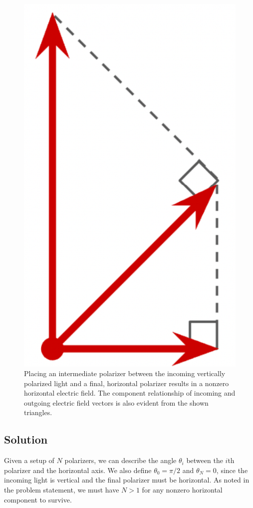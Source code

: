 \documentclass[reqno]{amsart}
\begin{document}
\begin{figure}[h]
	\centering
	\includegraphics[scale = 0.5]{Polarizers.png}
	\caption{Placing an intermediate polarizer between the incoming vertically polarized light and a final, horizontal polarizer results in a nonzero horizontal electric field. The component relationship of incoming and outgoing electric field vectors is also evident from the shown triangles.}
	\label{fig:polarizers}
\end{figure}

\subsection*{Solution}

Given a setup of $N$ polarizers, we can describe the angle $\theta_i$ between the $i$th polarizer and the horizontal axis. We also define $\theta_0=\pi/2$ and $\theta_N=0$, since the incoming light is vertical and the final polarizer must be horizontal. As noted in the problem statement, we must have $N>1$ for any nonzero horizontal component to survive.
\end{document}

